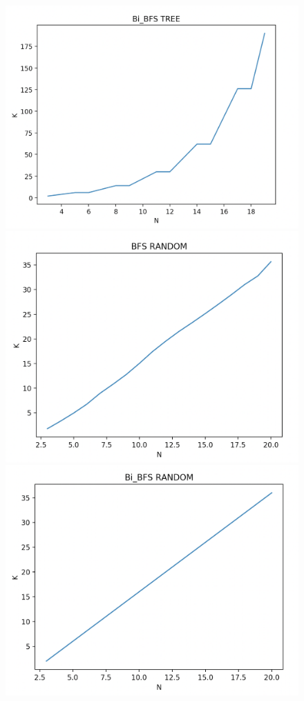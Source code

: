 \documentclass[12pt]{article}
\begin{document}
\begin{enumerate}
\begin{figure}
\begin{center}
\includegraphics[scale=0.4]{plot4.png} 
\includegraphics[scale=0.4]{plot5.png} 
\includegraphics[scale=0.4]{plot6.png} 
\end{center}
\end{figure}





\end{enumerate}
\end{document}
